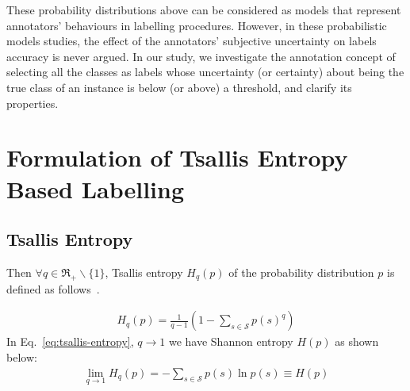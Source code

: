 \documentclass[a4paper,conference]{IEEEtran}
\begin{document}
These probability distributions above can be considered as models that represent annotators' behaviours in labelling procedures.
However, in these probabilistic models studies, the effect of the annotators' subjective uncertainty on labels accuracy is never argued.
In our study, we investigate the annotation concept of selecting all the classes as labels whose uncertainty (or certainty) about being the true class of an instance is below (or above) a threshold, and clarify its properties.

\section{Formulation of Tsallis Entropy Based Labelling}\label{sec:formulation}
\subsection{Tsallis Entropy}
Then $\forall q \in \mathfrak{R}_{+}\backslash\{1\}$, Tsallis entropy $H_{q}(p)$ of the probability distribution $p$ is defined as follows~\cite{Tsallis:1988}.

\begin{align}
    H_{q}(p) = \frac{1}{q-1}\left(1-\sum_{s \in \mathcal{S}}p(s)^{q}\right)\label{eq:tsallis-entropy}
\end{align}
In Eq.~\eqref{eq:tsallis-entropy}, $q \rightarrow 1$ we have Shannon entropy $H(p)$ as shown below:
\begin{align}
    \lim_{q \rightarrow 1}H_{q}(p) = - \sum_{s \in \mathcal{S}} p(s) \ln p(s) \equiv H(p)\label{eq:shannon-entropy}
\end{align}
\end{document}
